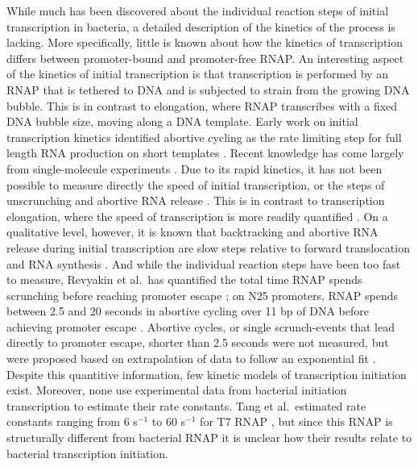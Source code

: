 While much has been discovered about the individual reaction steps of initial
transcription in bacteria, a detailed description of the kinetics of the
process is lacking. More specifically, little is known about how the kinetics
of transcription differs between promoter-bound and promoter-free RNAP. An
interesting aspect of the kinetics of initial transcription is that
transcription is performed by an RNAP that is tethered to
DNA and is subjected to strain from the growing DNA bubble.
This is in contrast to elongation, where RNAP transcribes with a fixed DNA
bubble size, moving along a DNA template. Early
work on initial transcription kinetics identified abortive cycling as the rate
limiting step for full length RNA production on short templates
\cite{stefano_lac_1979, munson_abortive_1981}. Recent knowledge has come
largely from single-molecule experiments \cite{revyakin_abortive_2006,
kapanidis_initial_2006, tang_real-time_2009, kapanidis_retention_2005,
margeat_direct_2006}. Due to its rapid kinetics, it has not been possible to
measure directly the speed of initial transcription, or the steps of
unscrunching and abortive RNA release \cite{revyakin_abortive_2006,
margeat_direct_2006}. This is in contrast to transcription elongation, where
the speed of transcription is more readily quantified \cite{wang_force_1998,
tolic-norrelykke_diversity_2004, bai_mechanochemical_2007}. On a qualitative
level, however, it is known that backtracking and abortive RNA release during
initial transcription are slow steps relative to forward translocation and RNA
synthesis \cite{revyakin_abortive_2006, margeat_direct_2006}. And while the
individual reaction steps have been too fast to measure, Revyakin et al.\ has
quantified the total time RNAP spends scrunching before reaching promoter
escape \cite{revyakin_abortive_2006}; on N25 promoters, RNAP spends between 2.5
and 20 seconds in abortive cycling over 11 bp of DNA before achieving promoter
escape \cite{revyakin_abortive_2006}. Abortive cycles, or single scrunch-events
that lead directly to promoter escape, shorter than 2.5 seconds were not
measured, but were proposed based on extrapolation of data to follow an
exponential fit \cite{revyakin_abortive_2006}. Despite this quantitive
information, few kinetic models of transcription initiation exist. Moreover,
none use experimental data from bacterial initiation transcription to estimate
their rate constants. Tang et al.\ estimated rate constants ranging from 6
s$^{-1}$ to 60 s$^{-1}$ for T7 RNAP \cite{tang_real-time_2009}, but since this
RNAP is structurally different from bacterial RNAP it is unclear how their
results relate to bacterial transcription initiation.

